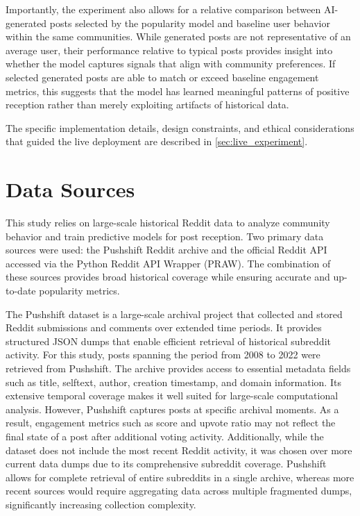 Importantly, the experiment also allows for a relative comparison between AI-generated posts selected by the popularity model and baseline user behavior within the same communities. While generated posts are not representative of an average user, their performance relative to typical posts provides insight into whether the model captures signals that align with community preferences. If selected generated posts are able to match or exceed baseline engagement metrics, this suggests that the model has learned meaningful patterns of positive reception rather than merely exploiting artifacts of historical data.

The specific implementation details, design constraints, and ethical considerations that guided the live deployment are described in \autoref{sec:live_experiment}.

\section{Data Sources}
\label{sec:data_sources}

This study relies on large-scale historical Reddit data to analyze community behavior and train predictive models for post reception. Two primary data sources were used: the Pushshift Reddit archive and the official Reddit API accessed via the Python Reddit API Wrapper (PRAW). The combination of these sources provides broad historical coverage while ensuring accurate and up-to-date popularity metrics.

The Pushshift dataset is a large-scale archival project that collected and stored Reddit submissions and comments over extended time periods. It provides structured JSON dumps that enable efficient retrieval of historical subreddit activity.
For this study, posts spanning the period from 2008 to 2022 were retrieved from Pushshift. The archive provides access to essential metadata fields such as title, selftext, author, creation timestamp, and domain information. Its extensive temporal coverage makes it well suited for large-scale computational analysis.
However, Pushshift captures posts at specific archival moments. As a result, engagement metrics such as score and upvote ratio may not reflect the final state of a post after additional voting activity. Additionally, while the dataset does not include the most recent Reddit activity, it was chosen over more current data dumps due to its comprehensive subreddit coverage. Pushshift allows for complete retrieval of entire subreddits in a single archive, whereas more recent sources would require aggregating data across multiple fragmented dumps, significantly increasing collection complexity.

